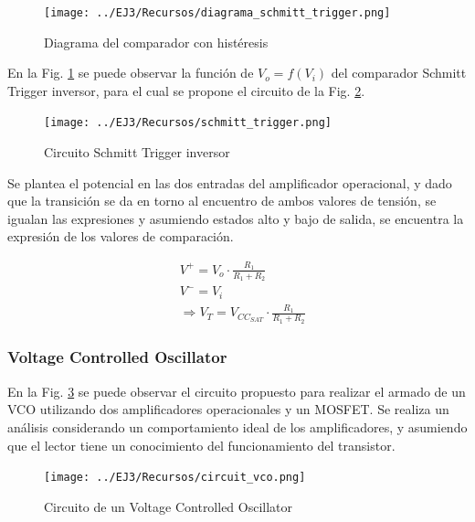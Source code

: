 \begin{figure}[H]
    \centering
    \texttt{[image: ../EJ3/Recursos/diagrama\_schmitt\_trigger.png]}
    \caption{Diagrama del comparador con hist\'eresis}
    \label{fig:diagrama_schmitt_trigger}
\end{figure}

En la Fig. \ref{fig:diagrama_schmitt_trigger} se puede observar la funci\'on de $V_o = f(V_i)$ del comparador Schmitt Trigger inversor,
para el cual se propone el circuito de la Fig. \ref{fig:circuito_schmitt_trigger}.

\begin{figure}[H]
    \centering
    \texttt{[image: ../EJ3/Recursos/schmitt\_trigger.png]}
    \caption{Circuito Schmitt Trigger inversor}
    \label{fig:circuito_schmitt_trigger}
\end{figure}

Se plantea el potencial en las dos entradas del amplificador operacional, y dado que la transici\'on se da en torno al encuentro
de ambos valores de tensi\'on, se igualan las expresiones y asumiendo estados alto y bajo de salida, se encuentra la expresi\'on
de los valores de comparaci\'on.

\begin{align*}
    & V^{+} = V_o \cdot \frac{R_1}{R_1 + R_2} \\
    & V^{-} = V_i \\
    & \Rightarrow V_T = V_{CC_{SAT}} \cdot \frac{R_1}{R_1 + R_2}
\end{align*}

\subsubsection{Voltage Controlled Oscillator}
En la Fig. \ref{fig:circuito_vco} se puede observar el circuito propuesto para realizar el armado de un VCO utilizando dos amplificadores operacionales
y un MOSFET. Se realiza un an\'alisis considerando un comportamiento ideal de los amplificadores, y asumiendo que el lector tiene un conocimiento del 
funcionamiento del transistor.

\begin{figure}[H]
    \centering
        \texttt{[image: ../EJ3/Recursos/circuit\_vco.png]}
    \caption{Circuito de un Voltage Controlled Oscillator}
    \label{fig:circuito_vco}
\end{figure}

